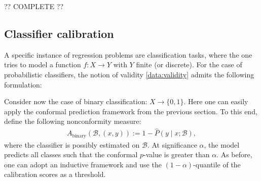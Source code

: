    ?? COMPLETE ??

\subsection{Classifier calibration}

    A specific instance of regression problems are classification tasks, where the one tries to model a function $f:X\rightarrow Y$ with $Y$ finite (or discrete). For the case of probabilistic classifiers, the notion of validity \ref{data:validity} admits the following formulation:

    Consider now the case of binary classification: $X\rightarrow\{0,1\}$. Here one can easily apply the conformal prediction framework from the previous section. To this end, define the following nonconformity measure:
    \begin{gather}
        A_\text{binary}(\mathcal{B},(x,y)) := 1 - \hat{P}(y\mid x;\mathcal{B}),
    \end{gather}
    where the classifier is possibly estimated on $\mathcal{B}$. At significance $\alpha$, the model predicts all classes such that the conformal $p$-value is greater than $\alpha$. As before, one can adopt an inductive framework and use the $(1-\alpha)$-quantile of the calibration scores as a threshold.

